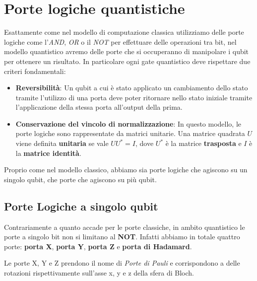 \section{Porte logiche quantistiche}
Esattamente come nel modello di computazione classica utilizziamo delle porte logiche come l'\textit{AND}, \textit{OR} o il \textit{NOT} per effettuare delle operazioni tra bit, nel modello quantistico avremo delle porte che si occuperanno di manipolare i qubit per ottenere un risultato. In particolare ogni gate quantistico deve rispettare due criteri fondamentali:

\begin{itemize}
  \item \textbf{Reversibilità}: Un qubit a cui è stato applicato un cambiamento dello stato tramite l'utilizzo di una porta deve poter ritornare nello stato iniziale tramite l'applicazione della stessa porta all'output della prima.
  \item \textbf{Conservazione del vincolo di normalizzazione}: In questo modello, le porte logiche sono rappresentate da matrici unitarie. Una matrice quadrata \( U \) viene definita \textbf{unitaria} se vale \( UU^* = I \), dove \( U^* \) è la matrice \textbf{trasposta} e \( I \) è la \textbf{matrice identità}.
\end{itemize}

Proprio come nel modello classico, abbiamo sia porte logiche che agiscono su un singolo qubit, che porte che agiscono su più qubit.

\subsection{Porte Logiche a singolo qubit}
Contrariamente a quanto accade per le porte classiche, in ambito quantistico le porte a singolo bit non si limitano al \textbf{NOT}. Infatti abbiamo in totale quattro porte: \textbf{porta X}, \textbf{porta Y}, \textbf{porta Z} e \textbf{porta di Hadamard}. 

Le porte X, Y e Z prendono il nome di \textit{Porte di Pauli} e corrispondono a delle rotazioni rispettivamente sull'asse x, y e z della sfera di Bloch.

